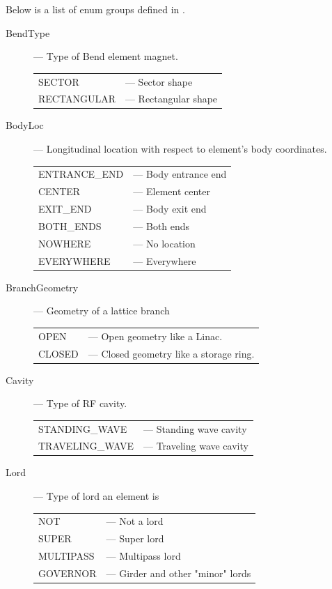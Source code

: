 Below is a list of enum groups defined in \accellat. 
\begin{description}
%
\item[BendType] --- Type of Bend element magnet.\Newline
\hspace*{-20pt}
\begin{tabular}{ll}
  SECTOR      & --- Sector shape\\
  RECTANGULAR & --- Rectangular shape \\
\end{tabular}
%
\item[BodyLoc] --- Longitudinal location with respect to element's body coordinates.\Newline
\hspace*{-20pt}
\begin{tabular}{ll}
  ENTRANCE_END & --- Body entrance end \\
  CENTER       & --- Element center \\
  EXIT_END     & --- Body exit end \\
  BOTH_ENDS    & --- Both ends \\
  NOWHERE      & --- No location \\
  EVERYWHERE   & --- Everywhere \\
\end{tabular}
%
\item[BranchGeometry] --- Geometry of a lattice branch\Newline
\hspace*{-20pt}
\begin{tabular}{ll}
  OPEN    & --- Open geometry like a Linac. \\
  CLOSED  & --- Closed geometry like a storage ring.
\end{tabular}
%
\item[Cavity] --- Type of RF cavity. \Newline
\hspace*{-20pt}
\begin{tabular}{ll}
  STANDING_WAVE   & --- Standing wave cavity \\
  TRAVELING_WAVE  & --- Traveling wave cavity \\
\end{tabular}
%
\item[Lord] --- Type of lord an element is \Newline
\hspace*{-20pt}
\begin{tabular}{ll}
  NOT       & --- Not a lord \\
  SUPER     & --- Super lord \\
  MULTIPASS & --- Multipass lord \\
  GOVERNOR  & --- Girder and other "minor" lords \\ 

\end{tabular}
\end{description}
